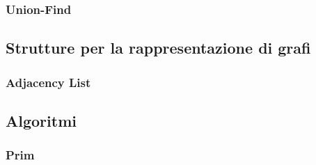 \documentclass[]{article}
\begin{document}
\subsubsection{Union-Find}
\subsection{Strutture per la rappresentazione di grafi}
\subsubsection{Adjacency List}
\subsection{Algoritmi}
\subsubsection{Prim}
\newpage
\end{document}
